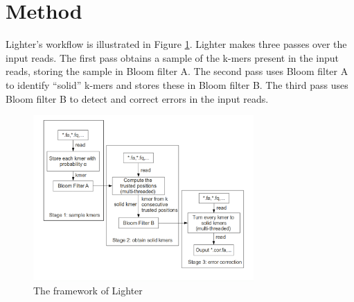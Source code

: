 \documentclass[10pt]{article}
\begin{document}

\section*{Method}
Lighter's workflow is illustrated in Figure \ref{fig:lighter_framework}. Lighter makes three passes over the input reads.  The first pass obtains a sample of the k-mers present in the input reads, storing the sample in Bloom filter A.  The second pass uses Bloom filter A to identify ``solid'' k-mers and stores these in Bloom filter B.  The third pass uses Bloom filter B to detect and correct errors in the input reads.

\begin{figure}[h!]
\begin{center}
\includegraphics[width=0.75\textwidth]{lighter_framework.png}
\caption{The framework of Lighter\label{fig:lighter_framework}}
\end{center}
\end{figure}
\end{document}

